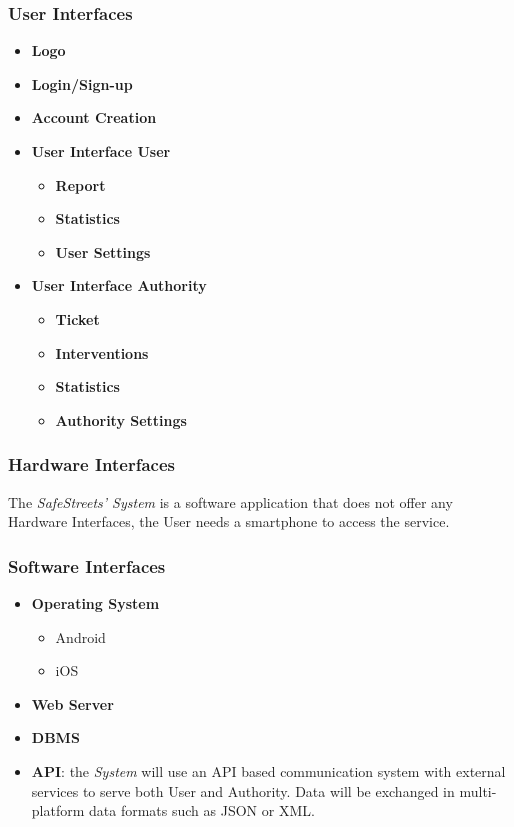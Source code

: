\documentclass {article}
\begin{document}
	\subsubsection{User Interfaces} 
	\begin{itemize} 
		\item {\bf Logo}
		\item {\bf Login/Sign-up}
		\item {\bf Account Creation}
		\item {\bf User Interface User}
			\begin{itemize}
			\item {\bf Report}
			\item {\bf Statistics}
			\item {\bf User Settings}
			\end{itemize}
		\item {\bf User Interface Authority}
			\begin{itemize}
			\item {\bf Ticket}
			\item {\bf Interventions}
			\item {\bf Statistics}
			\item {\bf Authority Settings}
			\end{itemize}
	\end{itemize}
	\subsubsection{Hardware Interfaces}
	The {\it SafeStreets' System} is a software application that does not offer any Hardware Interfaces, the User needs a smartphone to access the service.  
	\subsubsection{Software Interfaces}
	\begin{itemize}
		\item {\bf Operating System}
			\begin{itemize}
			\item Android
			\item iOS
			\end{itemize}
		\item {\bf Web Server}
		\item {\bf DBMS}
		\item {\bf API}: the {\it System} will use an API based communication system with external services to serve both User and Authority. Data will be exchanged in multi-platform data formats such as JSON or XML.
	\end{itemize}
\end{document}
